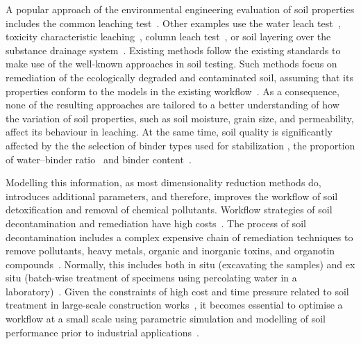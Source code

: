 \documentclass[algorithms,article,accept,pdftex,moreauthors]{Definitions/mdpi}
\begin{document}
{A }popular {approach of the }environmental engineering {evaluation of soil} properties{ includes the} common leaching test~\cite{Chittoori,Beauchesne,Lemenkova202233}. {Other} examples use the water leach test~\cite{Schreck,Becker}, toxicity characteristic leaching~\cite{Fuessle}, column leach test~\cite{Dayioglu,Sauer}, or soil layering over the substance drainage system~\cite{Yu}. Existing methods follow the existing standards to make use of {the }well-known approaches in soil testing. Such methods focus on remediation of {the }ecologically degraded and contaminated soil, assuming that {its} properties conform to the {models} in {the }existing workflow~\cite{Alpaslan,ma16093444,su15064950}. As a consequence, none of the resulting approaches are tailored to {a better }understanding {of how the} variation of soil properties, such as soil moisture{, }grain size{, and permeability, affect its behaviour in leaching}. {At} the same time, {soil quality is significantly affected by the }the selection of binder types {used for stabilization }\cite{Paniagua,TONINIDEARAUJO2023129757,Filho}{, }the proportion of water--binder ratio~\cite{Kukko} and {binder content}~\cite{Lametal2018}. 

Modelling this information, as most dimensionality reduction methods do, introduces additional parameters, and therefore, {improves the workflow }of soil detoxification and removal of chemical pollutants. Workflow strategies of soil decontamination {and remediation }have high costs~\cite{Ghavami,Mishra,Lu}. The process of soil decontamination includes a complex {expensive }chain of remediation techniques {to remove pollutants, heavy metals, organic and inorganic toxins, and organotin compounds}~\cite{Agarwal,DU2014141,SARKER2023138861}. Normally, this includes both {in situ} (excavating the samples) and {ex situ} {(}batch-wise treatment of specimens using percolating water {in a laboratory})~\cite{LU2023130021,CHEN2010638,KAVAMURA201061}. Given the {constraints of high cost and time pressure related to }soil treatment in large-scale construction works~\cite{ChenLi,recycling1030328,Ahmed}, it becomes essential to optimise a workflow {at a small scale }using {parametric simulation and} modelling {of soil performance }prior to {industrial applications}~\cite{7733108}.  
\end{document}
